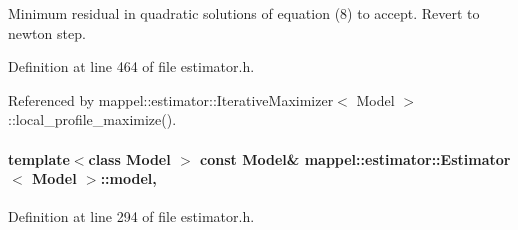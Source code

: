 Minimum residual in quadratic solutions of equation (8) to accept. Revert to newton step. 



Definition at line 464 of file estimator.\+h.



Referenced by mappel\+::estimator\+::\+Iterative\+Maximizer$<$ Model $>$\+::local\+\_\+profile\+\_\+maximize().

\paragraph[{\texorpdfstring{model}{model}}]{\setlength{\rightskip}{0pt plus 5cm}template$<$class Model $>$ const Model\& {\bf mappel\+::estimator\+::\+Estimator}$<$ Model $>$\+::model\hspace{0.3cm}{\ttfamily [protected]}, {\ttfamily [inherited]}}\hypertarget{classmappel_1_1estimator_1_1Estimator_a2f157410771fb79a20d4d54e505750d0}{}\label{classmappel_1_1estimator_1_1Estimator_a2f157410771fb79a20d4d54e505750d0}


Definition at line 294 of file estimator.\+h.



